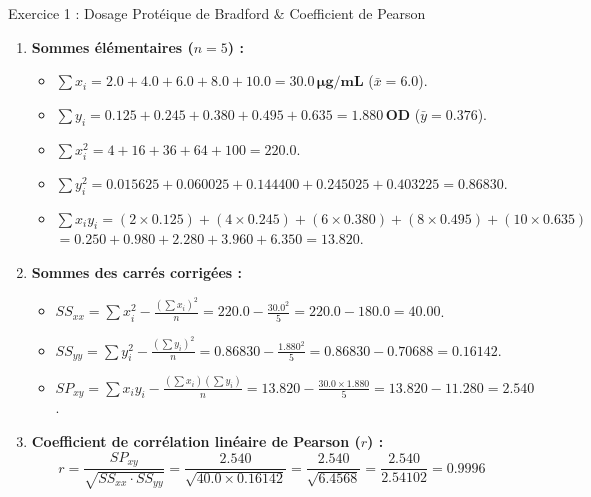 \documentclass[11pt,a4paper]{article}
\begin{document}

\begin{solutionbox}{Exercice 1 : Dosage Protéique de Bradford \& Coefficient de Pearson}
\begin{enumerate}[label=\textbf{\alph*.}]
  \item \textbf{Sommes élémentaires ($n = 5$) :}
  \begin{itemize}
    \item $\sum x_i = 2.0 + 4.0 + 6.0 + 8.0 + 10.0 = \mathbf{30.0\,\mu\text{g/mL}}$ ($\bar{x} = 6.0$).
    \item $\sum y_i = 0.125 + 0.245 + 0.380 + 0.495 + 0.635 = \mathbf{1.880\,\text{OD}}$ ($\bar{y} = 0.376$).
    \item $\sum x_i^2 = 4 + 16 + 36 + 64 + 100 = \mathbf{220.0}$.
    \item $\sum y_i^2 = 0.015625 + 0.060025 + 0.144400 + 0.245025 + 0.403225 = \mathbf{0.86830}$.
    \item $\sum x_i y_i = (2 \times 0.125) + (4 \times 0.245) + (6 \times 0.380) + (8 \times 0.495) + (10 \times 0.635)$ \\
    $= 0.250 + 0.980 + 2.280 + 3.960 + 6.350 = \mathbf{13.820}$.
  \end{itemize}

  \item \textbf{Sommes des carrés corrigées :}
  \begin{itemize}
    \item $SS_{xx} = \sum x_i^2 - \frac{(\sum x_i)^2}{n} = 220.0 - \frac{30.0^2}{5} = 220.0 - 180.0 = \mathbf{40.00}$.
    \item $SS_{yy} = \sum y_i^2 - \frac{(\sum y_i)^2}{n} = 0.86830 - \frac{1.880^2}{5} = 0.86830 - 0.70688 = \mathbf{0.16142}$.
    \item $SP_{xy} = \sum x_i y_i - \frac{(\sum x_i)(\sum y_i)}{n} = 13.820 - \frac{30.0 \times 1.880}{5} = 13.820 - 11.280 = \mathbf{2.540}$.
  \end{itemize}

  \item \textbf{Coefficient de corrélation linéaire de Pearson ($r$) :}
  \begin{equation*}
    r = \frac{SP_{xy}}{\sqrt{SS_{xx} \cdot SS_{yy}}} = \frac{2.540}{\sqrt{40.0 \times 0.16142}} = \frac{2.540}{\sqrt{6.4568}} = \frac{2.540}{2.54102} = \mathbf{0.9996}
  \end{equation*}


\end{enumerate}
\end{solutionbox}
\end{document}
